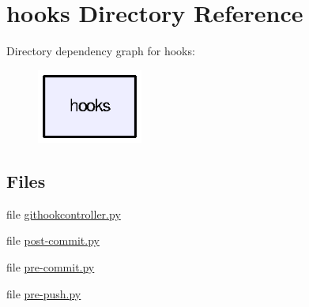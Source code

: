 \section{hooks Directory Reference}
\label{dir_e9740be0e6b1994ed8ecbcf3127ad49f}
Directory dependency graph for hooks\-:\nopagebreak
\begin{figure}[H]
\begin{center}
\leavevmode
\includegraphics[width=98pt]{dir_e9740be0e6b1994ed8ecbcf3127ad49f_dep}
\end{center}
\end{figure}
\subsection*{Files}
\begin{DoxyCompactItemize}
\item 
file \hyperlink{githookcontroller_8py}{githookcontroller.\-py}
\item 
file \hyperlink{post-commit_8py}{post-\/commit.\-py}
\item 
file \hyperlink{pre-commit_8py}{pre-\/commit.\-py}
\item 
file \hyperlink{pre-push_8py}{pre-\/push.\-py}
\end{DoxyCompactItemize}
